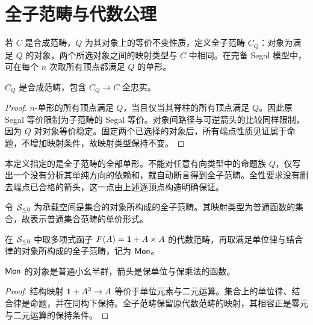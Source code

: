 \section{全子范畴与代数公理}
\begin{definition}[按对象性质取全子范畴]
若 $C$ 是合成范畴，$Q$ 为其对象上的等价不变性质，定义全子范畴 $C_Q$：对象为满足 $Q$ 的对象，两个所选对象之间的映射类型与 $C$ 中相同。在完备 Segal 模型中，可在每个 $n$ 次取所有顶点都满足 $Q$ 的单形。
\end{definition}
\begin{proposition}
$C_Q$ 是合成范畴，包含 $C_Q\to C$ 全忠实。
\end{proposition}
\begin{proof}
$n$-单形的所有顶点满足 $Q$，当且仅当其脊柱的所有顶点满足 $Q$。因此原 Segal 等价限制为子范畴的 Segal 等价。对象间路径与可逆箭头的比较同样限制，因为 $Q$ 对对象等价稳定。固定两个已选择的对象后，所有端点性质见证属于命题，不增加映射条件，故映射类型保持不变。
\end{proof}
\begin{remark}
本定义指定的是全子范畴的全部单形。不能对任意有向类型中的命题族 $Q$，仅写出一个没有分析其单纯方向的依赖和，就自动断言得到全子范畴。全性要求没有删去端点已合格的箭头，这一点由上述逐顶点构造明确保证。
\end{remark}
\begin{definition}[集合范畴]
令 $\mathcal S_{\le0}$ 为承载空间是集合的对象所构成的全子范畴。其映射类型为普通函数的集合，故表示普通集合范畴的单价形式。
\end{definition}
\begin{definition}[幺半群范畴]
在 $\mathcal S_{\le0}$ 中取多项式函子 $F(A)=\mathbf 1+A\times A$ 的代数范畴，再取满足单位律与结合律的对象所构成的全子范畴，记为 $\mathsf{Mon}$。
\end{definition}
\begin{proposition}
$\mathsf{Mon}$ 的对象是普通小幺半群，箭头是保单位与保乘法的函数。
\end{proposition}
\begin{proof}
结构映射 $\mathbf 1+A^2\to A$ 等价于单位元素与二元运算。集合上的单位律、结合律是命题，并在同构下保持。全子范畴保留原代数范畴的映射，其相容正是零元与二元运算的保持条件。
\end{proof}

